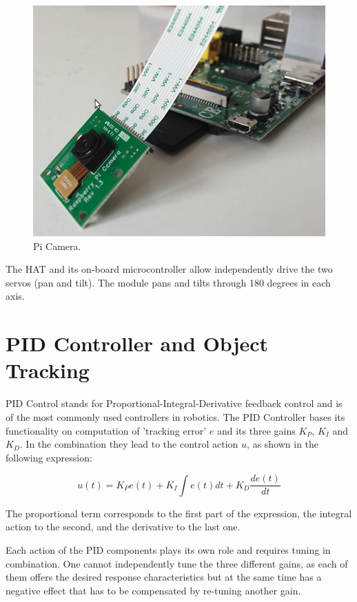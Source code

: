 \documentclass[runningheads]{llncs}
\begin{document}
\begin{description}
 \begin{figure}[hbt!]
\includegraphics[width=\textwidth]{Pi camera.png}
\caption{Pi Camera.} \label{fig1}
\end{figure}
 \item[$\bullet$ Pan-Tilt HAT]
  \item\noindent The HAT and its on-board microcontroller allow independently drive the two servos (pan and tilt). The module pans and tilts through 180 degrees in each axis.\cite{tech_doc}
\end{description}

\section{PID Controller and Object Tracking}
PID Control stands for Proportional-Integral-Derivative feedback control and is of the most commonly used controllers in robotics. The PID Controller bases its functionality on computation of 'tracking error' $e$ and its three gains $K_P$, $K_I$ and $K_D$. 
In the combination they lead to the control action $u$, as shown in the following expression:

\begin{equation}
u(t) = K_P e(t) +  K_I\int e(t)dt + K_D\frac {de(t)}{dt}
\end{equation}

\item\noindent The proportional term corresponds to the first part of the expression, the integral action to the second, and the derivative to the last one. 
\item\noindent Each action of the PID components plays its own role and requires tuning in combination. One cannot independently tune the three different gains, as each of them offers the desired response characteristics but at the same time has a negative effect that has to be compensated by re-tuning another gain.\cite{ref_url3}
\end{document}

